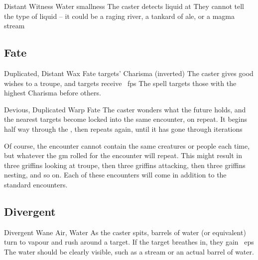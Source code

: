 \begin{multicols}{2}
  {Distant}%
  {Witness}%
  {Water}%
  {smallness}%
  {The caster detects liquid at \spellRange}%
  {They cannot tell the type of liquid -- it could be a raging river, a tankard of ale, or a magma stream}





\subsection{Fate}
\label{fateSpells}



  {Duplicated, Distant}%
  {Wax}%
  {Fate}%
  {targets' Charisma (inverted)}%
  {The caster gives good wishes to a troupe, and  targets receive \showDam~\glspl{fp}}%
  {The spell targets those with the highest Charisma before others.}


  {Devious, Duplicated}%
  {Warp}%
  {Fate}%
  {}%
  {The caster wonders what the future holds, and the nearest  targets become locked into the same encounter, on repeat.
  It begins half way through the \showOnset, then repeats again, until it has gone through  iterations}%
  {\par
  Of course, the encounter cannot contain the same creatures or people each time, but whatever the \gls{gm} rolled for the encounter will repeat.
  This might result in three \glspl{griffin} looking at troupe, then three \glspl{griffin} attacking, then three \glspl{griffin} nesting, and so on.
  Each of these encounters will come in addition to the standard encounters.}


\subsection{Divergent}
\label{divergentSpells}

  {Divergent}%
  {Wane}%
  {Air, Water}%
  {}%
  {As the caster spits,  barrels of water (or equivalent) turn to vapour and rush around a target.
  If the target breathes in, they gain ~\glspl{ep}}%
  {
    The water should be clearly visible, such as a stream or an actual barrel of water.}


\end{multicols}
